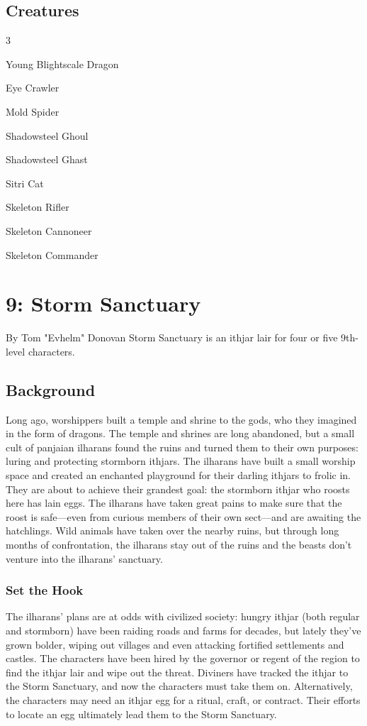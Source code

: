\documentclass[10pt,a4paper,twoside,twocolumn,openany,bg=print,nodeprecatedcode]{dndbook}
\begin{document}
\section{Creatures}

\begin{itemize}
\begin{multicols}{3}
\item Young Blightscale Dragon
\item Eye Crawler
\item Mold Spider
\item Shadowsteel Ghoul
\item Shadowsteel Ghast
\item Sitri Cat
\item Skeleton Rifler
\item Skeleton Cannoneer
\item Skeleton Commander
\end{multicols}

\end{itemize}

\chapter{9: Storm Sanctuary}
By Tom "Evhelm" Donovan
Storm Sanctuary is an ithjar lair for four or five 9th-level characters.
\section{Background}
Long ago, worshippers built a temple and shrine to the gods, who they imagined in the form of dragons. The temple and shrines are long abandoned, but a small cult of panjaian ilharans found the ruins and turned them to their own purposes: luring and protecting stormborn ithjars. The ilharans have built a small worship space and created an enchanted playground for their darling ithjars to frolic in. They are about to achieve their grandest goal: the stormborn ithjar who roosts here has lain eggs. The ilharans have taken great pains to make sure that the roost is safe—even from curious members of their own sect—and are awaiting the hatchlings. Wild animals have taken over the nearby ruins, but through long months of confrontation, the ilharans stay out of the ruins and the beasts don't venture into the ilharans' sanctuary.
\subsection{Set the Hook}
The ilharans' plans are at odds with civilized society: hungry ithjar (both regular and stormborn) have been raiding roads and farms for decades, but lately they've grown bolder, wiping out villages and even attacking fortified settlements and castles. The characters have been hired by the governor or regent of the region to find the ithjar lair and wipe out the threat. Diviners have tracked the ithjar to the Storm Sanctuary, and now the characters must take them on. Alternatively, the characters may need an ithjar egg for a ritual, craft, or contract. Their efforts to locate an egg ultimately lead them to the Storm Sanctuary.
\end{document}
